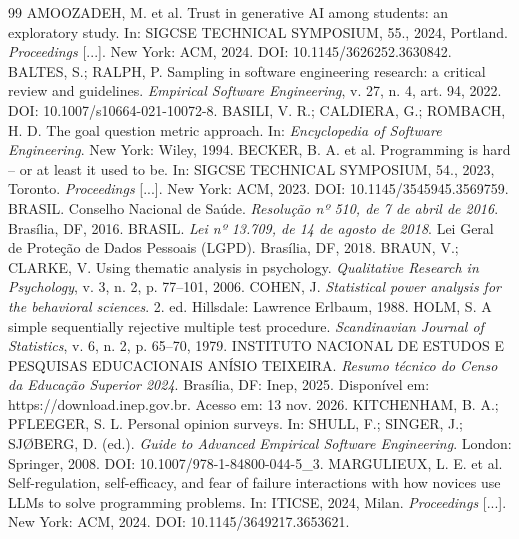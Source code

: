 \documentclass[12pt,a4paper]{article}
\begin{document}
\begingroup
\singlespacing
\renewcommand{\refname}{Referências}
\raggedright
\setlength{\parindent}{0pt}
\begin{thebibliography}{99}\setlength{\itemsep}{3pt}\setlength{\parskip}{0pt}
 AMOOZADEH, M. et al. Trust in generative AI among students: an exploratory study. In: SIGCSE TECHNICAL SYMPOSIUM, 55., 2024, Portland. \emph{Proceedings} [...]. New York: ACM, 2024. DOI: 10.1145/3626252.3630842.
 BALTES, S.; RALPH, P. Sampling in software engineering research: a critical review and guidelines. \emph{Empirical Software Engineering}, v. 27, n. 4, art. 94, 2022. DOI: 10.1007/s10664-021-10072-8.
 BASILI, V. R.; CALDIERA, G.; ROMBACH, H. D. The goal question metric approach. In: \emph{Encyclopedia of Software Engineering}. New York: Wiley, 1994.
 BECKER, B. A. et al. Programming is hard -- or at least it used to be. In: SIGCSE TECHNICAL SYMPOSIUM, 54., 2023, Toronto. \emph{Proceedings} [...]. New York: ACM, 2023. DOI: 10.1145/3545945.3569759.
 BRASIL. Conselho Nacional de Saúde. \emph{Resolução nº 510, de 7 de abril de 2016}. Brasília, DF, 2016.
 BRASIL. \emph{Lei nº 13.709, de 14 de agosto de 2018}. Lei Geral de Proteção de Dados Pessoais (LGPD). Brasília, DF, 2018.
 BRAUN, V.; CLARKE, V. Using thematic analysis in psychology. \emph{Qualitative Research in Psychology}, v. 3, n. 2, p. 77--101, 2006.
 COHEN, J. \emph{Statistical power analysis for the behavioral sciences}. 2. ed. Hillsdale: Lawrence Erlbaum, 1988.
 HOLM, S. A simple sequentially rejective multiple test procedure. \emph{Scandinavian Journal of Statistics}, v. 6, n. 2, p. 65--70, 1979.
 INSTITUTO NACIONAL DE ESTUDOS E PESQUISAS EDUCACIONAIS ANÍSIO TEIXEIRA. \emph{Resumo técnico do Censo da Educação Superior 2024}. Brasília, DF: Inep, 2025. Disponível em: https://download.inep.gov.br. Acesso em: 13 nov. 2026.
 KITCHENHAM, B. A.; PFLEEGER, S. L. Personal opinion surveys. In: SHULL, F.; SINGER, J.; SJØBERG, D. (ed.). \emph{Guide to Advanced Empirical Software Engineering}. London: Springer, 2008. DOI: 10.1007/978-1-84800-044-5\_3.
 MARGULIEUX, L. E. et al. Self-regulation, self-efficacy, and fear of failure interactions with how novices use LLMs to solve programming problems. In: ITICSE, 2024, Milan. \emph{Proceedings} [...]. New York: ACM, 2024. DOI: 10.1145/3649217.3653621.

\end{thebibliography}
\end{document}
